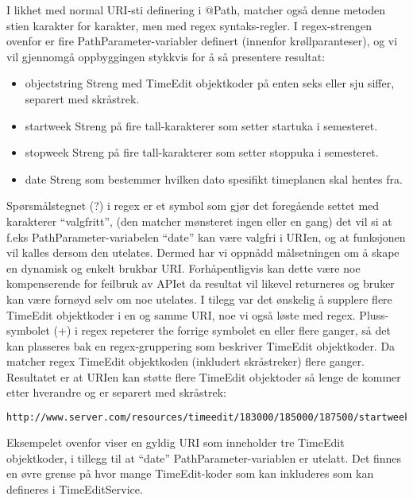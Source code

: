 \documentclass[../main.tex]{subfiles}
\begin{document}
I likhet med normal URI-sti definering i @Path, matcher også denne metoden stien karakter for karakter, men med regex syntaks-regler. I regex-strengen ovenfor er fire PathParameter-variabler definert (innenfor krøllparanteser), og vi vil gjennomgå oppbyggingen stykkvis for å så presentere resultat:

\begin{itemize}
\item objectstring \newline Streng med TimeEdit objektkoder på enten seks eller sju siffer, separert med skråstrek.
\item startweek \newline Streng på fire tall-karakterer som setter startuka i semesteret.
\item stopweek \newline Streng på fire tall-karakterer som setter stoppuka i semesteret.
\item date \newline Streng som bestemmer hvilken dato spesifikt timeplanen skal hentes fra.
\end{itemize}

Spørsmålstegnet (?) i regex er et symbol som gjør det foregående settet med karakterer “valgfritt”, (den matcher mønsteret ingen eller en gang) det vil si at f.eks PathParameter-variabelen “date” kan være valgfri i URIen, og at funksjonen vil kalles dersom den utelates. Dermed har vi oppnådd målsetningen om å skape en dynamisk og enkelt brukbar URI. Forhåpentligvis kan dette være noe kompenserende for feilbruk av APIet da resultat vil likevel returneres og bruker kan være fornøyd selv om noe utelates.
\newline
I tilegg var det ønskelig å supplere flere TimeEdit objektkoder i en og samme URI, noe vi også løste med regex. Pluss-symbolet (+) i regex repeterer the forrige symbolet en eller flere ganger, så det kan plasseres bak en regex-gruppering som beskriver TimeEdit objektkoder. Da matcher regex TimeEdit objektkoden (inkludert skråstreker) flere ganger. Resultatet er at URIen kan støtte flere TimeEdit objektoder så lenge de kommer etter hverandre og er separert med skråstrek:

\begin{lstlisting}[language=HTML, frame=single, caption={Fungerende eksempel på en URI i APIet.}]
http://www.server.com/resources/timeedit/183000/185000/187500/startweek/1301/stopweek/1315
\end{lstlisting}

Eksempelet ovenfor viser en gyldig URI som inneholder tre TimeEdit objektkoder, i tillegg til at “date” PathParameter-variablen er utelatt. Det finnes en øvre grense på hvor mange TimeEdit-koder som kan inkluderes som kan defineres i TimeEditService.\newline
\end{document}
